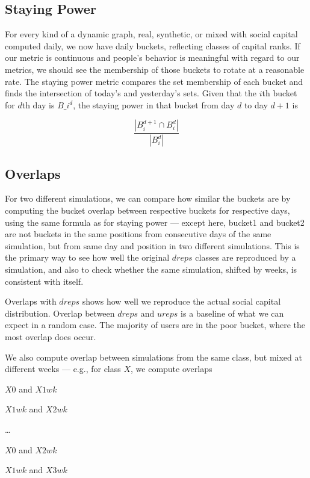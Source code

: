 \documentclass[10pt,oneside]{memoir}
\begin{document}
\subsection{Staying Power}
\label{stayingpower}

For every kind of a dynamic graph, real, synthetic, or mixed with social capital computed daily, we now have daily buckets, reflecting classes of capital ranks.  If our metric is continuous and people's behavior is meaningful with regard to our metrics, we should see the membership of those buckets to rotate at a reasonable rate.  The staying power metric compares the set membership of each bucket and finds the intersection of today's and yesterday's sets.  Given that the $i$th bucket for $d$th day is $B\_i^d$, the staying power in that bucket from day $d$ to day $d+1$ is

\[ \frac{|B_i^{d+1} \cap B_i^d|}{|B_i^d|} \]



\subsection{Overlaps}
\label{overlaps}

For two different simulations, we can compare how similar the buckets are by computing the bucket overlap between respective buckets for respective days, using the same formula as for staying power --- except here, bucket1 and bucket2 are not buckets in the same positions from consecutive days of the same simulation,  but from same day and position in two different simulations.  This is the primary way to see how well the original $dreps$ classes are reproduced by a simulation, and also to check whether the same simulation, shifted by weeks, is consistent with itself.


Overlaps with $dreps$ shows how well we reproduce the actual social capital distribution.  Overlap between $dreps$ and $ureps$ is a baseline of what we can expect in a random case.  The majority of users are in the poor bucket, where the most overlap does occur.


We also compute overlap between simulations from the same class, but mixed at different weeks --- e.g., for class $X$, we compute overlaps


$X0$ and $X1wk$


$X1wk$ and $X2wk$


{\ldots}


$X0$ and $X2wk$


$X1wk$ and $X3wk$
\end{document}
